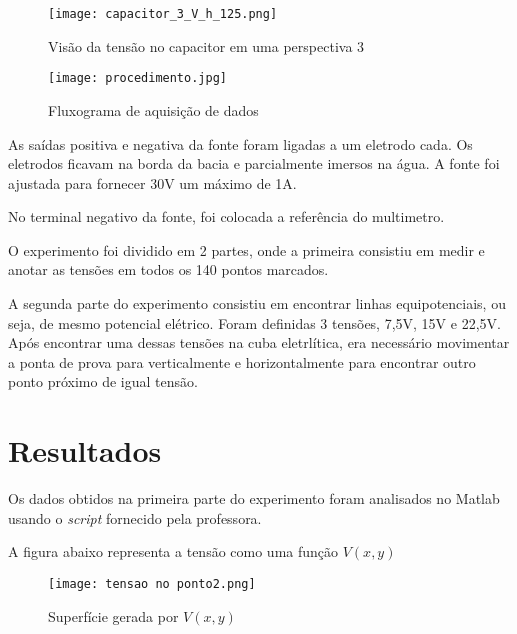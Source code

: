 \documentclass[
12pt,				%
oneside,			%
a4paper,			%
english,			%
french,				%
spanish,			%
brazil				%
]{abntex2}
\begin{document}
\begin{figure}[H]
	\begin{center}
		\texttt{[image: capacitor\_3\_V\_h\_125.png]}
		\caption{Visão da tensão no capacitor em uma perspectiva 3}
		\label{fluxograma}
	\end{center}
\end{figure}

\begin{figure}[H]
	\begin{center}
		\texttt{[image: procedimento.jpg]}
		\caption{Fluxograma de aquisição de dados}
		\label{fluxograma}
	\end{center}
\end{figure}

As saídas positiva e negativa da fonte foram ligadas a um eletrodo cada. Os eletrodos ficavam na borda da bacia e parcialmente imersos na água. A fonte foi ajustada para fornecer 30V um máximo de 1A.

No terminal negativo da fonte, foi colocada a referência do multimetro.

O experimento foi dividido em 2 partes, onde a primeira consistiu em medir e anotar as tensões em todos os 140 pontos marcados.

A segunda parte do experimento consistiu em encontrar linhas equipotenciais, ou seja, de mesmo potencial elétrico. Foram definidas 3 tensões, 7,5V, 15V e 22,5V. Após encontrar uma dessas tensões na cuba eletrlítica, era necessário movimentar a ponta de prova para verticalmente e horizontalmente para encontrar outro ponto próximo de igual tensão.

\chapter{Resultados}

Os dados obtidos na primeira parte do experimento foram analisados no Matlab usando o \textit{script} fornecido pela professora.

A figura abaixo representa a tensão como uma função $V(x,y)$

\begin{figure}[H]
	\begin{center}
		\texttt{[image: tensao no ponto2.png]}
		\caption{Superfície gerada por $V(x,y)$}
		\label{fluxograma}
	\end{center}
\end{figure}
\end{document}
